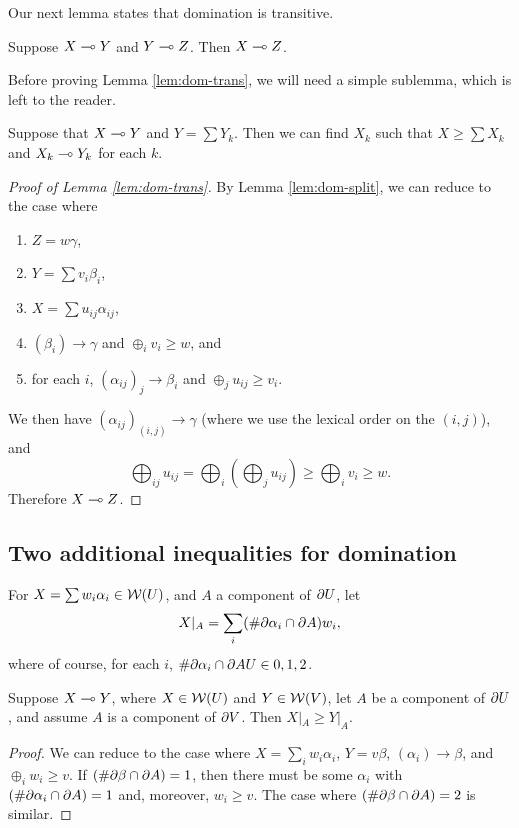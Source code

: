 Our next lemma states that domination is transitive.
\begin{lemma} \label{lem:dom-trans}
Suppose $X \multimap Y$ and $Y \multimap Z$. 
Then $X \multimap Z$.
\end{lemma}
Before proving Lemma \ref{lem:dom-trans},
we will need a simple sublemma, which is left to the reader. 
\begin{lemma} \label{lem:dom-split}
Suppose that $X \multimap Y$ and $Y = \sum Y_k$.
Then we can find $X_k$ such that $X \ge \sum X_k$ and $X_k \multimap Y_k$ for each $k$.
\end{lemma}
\begin{proof}[Proof of Lemma \ref{lem:dom-trans}]
By Lemma \ref{lem:dom-split},
we can reduce to the case where 
\begin{enumerate}
\item
$Z = w \gamma$,
\item
$Y = \sum v_i \beta_i$,
\item
$X = \sum u_{ij} \alpha_{ij}$,
\item
$(\beta_i) \to \gamma$ and $\oplus_i v_i \ge w$, and
\item
for each $i$, $(\alpha_{ij})_j \to \beta_i$ and $\oplus_j  u_{ij} \ge v_i$. 
\end{enumerate}
We then have
$(\alpha_{ij})_{(i, j)} \to \gamma$ (where we use the lexical order on the $(i, j)$),
and $$\bigoplus_{ij} u_{ij} = \bigoplus_i (\bigoplus_j u_{ij}) \ge \bigoplus_i v_i \ge w.$$
Therefore $X \multimap Z$. 
\end{proof}

\subsection{Two additional inequalities for domination}
For $X = \sum w_i \alpha_i \in {\mathcal W}(U)$, and $A$ a component of $\partial U$, let 
$$X|_A = \sum_i (\# \partial \alpha_i \cap \partial A) w_i,$$
where of course,
for each $i$,
$\# \partial \alpha_i \cap \partial AU \in 0, 1, 2$. 
\begin{lemma} \label{lem:dom-restr}
Suppose $X \multimap Y$, where $X \in {\mathcal W}(U)$ and $Y \in {\mathcal W}(V)$, let $A$ be a component of $\partial U$,
and assume $A$ is a component of $\partial  V$.
Then $X|_A \ge Y|_A$. 
\end{lemma}
\begin{proof}
We can reduce to the case where $X = \sum_i  w_i \alpha_i$, $Y = v \beta$, $(\alpha_i) \to \beta$, and $\oplus_i w_i \ge v$. 
If $(\# \partial \beta \cap \partial A) = 1$, then there must be some $\alpha_i$ with $(\# \partial \alpha_i \cap \partial A) = 1$ and, moreover, $w_i \ge v$. The case where $(\# \partial \beta \cap \partial A) = 2$ is similar. 
\end{proof}


